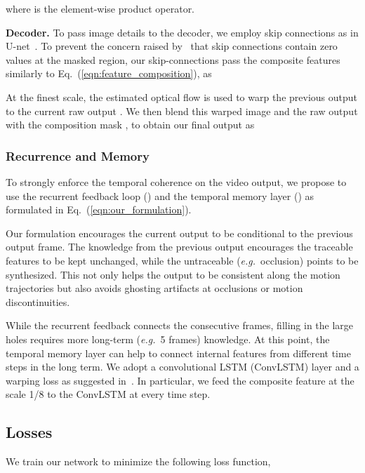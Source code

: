 \documentclass[10pt,twocolumn,letterpaper]{article}
\newcommand{\eqnref}[1]{Eq.~(\ref{#1})}
\renewcommand{\paragraph}[1]{\vspace{1mm}\noindent\textbf{#1}}
\renewcommand{\eg}{\textit{e.g.}}
\begin{document}
where  is the element-wise product operator. 

\paragraph{Decoder.} 
To pass image details to the decoder, we employ skip connections as in U-net~\cite{ronneberger2015u}. To prevent the concern raised by~\cite{yu2018free} that skip connections contain zero values at the masked region, our skip-connections pass the composite features similarly to \eqnref{eqn:feature_composition}, as 

At the finest scale, the estimated optical flow  is used to warp the previous output  to the current raw output . We then blend this warped image and the raw output with the composition mask , to obtain our final output  as



\subsubsection{Recurrence and Memory}
To strongly enforce the temporal coherence on the video output, we propose to use the recurrent feedback loop () and the temporal memory layer () as formulated in \eqnref{eqn:our_formulation}. 

Our formulation encourages the current output to be conditional to the previous output frame. The knowledge from the previous output encourages the traceable features to be kept unchanged, while the untraceable (\eg~occlusion) points to be synthesized. This not only helps the output to be consistent along the motion trajectories but also avoids ghosting artifacts at occlusions or motion discontinuities.

While the recurrent feedback connects the consecutive frames, filling in the large holes requires more long-term (\eg~5 frames) knowledge. 
At this point, the temporal memory layer can help to connect internal features from different time steps in the long term. We adopt a convolutional LSTM (ConvLSTM) layer and a warping loss as suggested in~\cite{lai2018learning}. In particular, we feed the composite feature  at the scale 1/8 to the ConvLSTM at every time step.


\subsection{Losses}
We train our network to minimize the following loss function,
\end{document}
